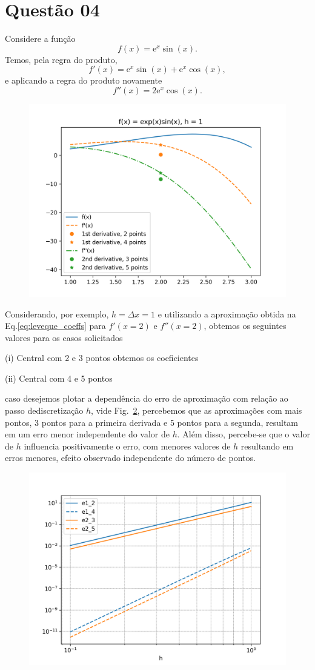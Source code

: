 \documentclass{article}
\newcommand{\euler}{\mathrm{e}}
\begin{document}
\section{Questão 04}
Considere a função 
\[ f(x) = \euler^x \sin(x).
\]
Temos, pela regra do produto, 
\[ f'(x) = \euler^x \sin(x) + \euler^x\cos(x),
\]
e aplicando a regra do produto novamente
\[ f''(x) =  2\euler^x\cos(x).
\]

\begin{figure}[h]
\centering
  \includegraphics[width=.8\textwidth]{figs/q4.png}
  \label{fig:q4}
\end{figure}
Considerando, por exemplo, $h=\Delta x = 1$ e
utilizando a aproximação obtida na Eq.\eqref{eq:leveque_coeffs} para $f'(x=2)$
e $f''(x=2)$, obtemos os seguintes valores para os casos solicitados

(i) Central com 2 e 3 pontos
obtemos os coeficientes 


(ii) Central com 4 e 5 pontos

caso desejemos plotar a dependência do erro de aproximação com relação ao passo dediscretização $h$, vide Fig.~\ref{fig:q4_error}, percebemos que as aproximações com mais pontos, 3 pontos para a primeira derivada e 5 pontos para a segunda, resultam em um erro menor independente do valor de $h$. Além disso, percebe-se que o valor de $h$ influencia positivamente o erro, com menores valores de $h$ resultando em erros menores, efeito observado independente do número de pontos.
\begin{figure}[h]
  \centering
  \includegraphics[width=.8\textwidth]{figs/q4_error.png}
  \label{fig:q4_error}
\end{figure}
\end{document}
